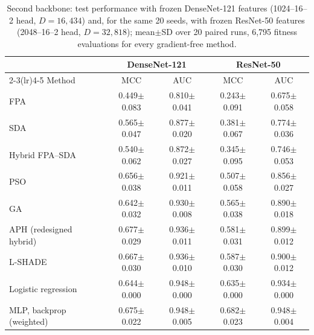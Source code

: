 \begin{table}[!t]
\centering
\caption{Second backbone: test performance with frozen DenseNet-121 features (1024--16--2 head, $D=16{,}434$) and, for the same 20 seeds, with frozen ResNet-50 features (2048--16--2 head, $D=32{,}818$); mean$\pm$SD over 20 paired runs, 6,795 fitness evaluations for every gradient-free method.}
\label{tab:densenet}
\footnotesize
\setlength{\tabcolsep}{4pt}
\begin{tabular}{lcccc}
\toprule
 & \multicolumn{2}{c}{DenseNet-121} & \multicolumn{2}{c}{ResNet-50} \\ \cmidrule(lr){2-3}\cmidrule(lr){4-5}
Method & MCC & AUC & MCC & AUC \\
\midrule
FPA & 0.449$\pm$0.083 & 0.810$\pm$0.041 & 0.243$\pm$0.091 & 0.675$\pm$0.058 \\
SDA & 0.565$\pm$0.047 & 0.877$\pm$0.020 & 0.381$\pm$0.067 & 0.774$\pm$0.036 \\
Hybrid FPA--SDA & 0.540$\pm$0.062 & 0.872$\pm$0.027 & 0.345$\pm$0.095 & 0.746$\pm$0.053 \\
PSO & 0.656$\pm$0.038 & 0.921$\pm$0.011 & 0.507$\pm$0.058 & 0.856$\pm$0.027 \\
GA & 0.642$\pm$0.032 & 0.930$\pm$0.008 & 0.565$\pm$0.038 & 0.890$\pm$0.018 \\
APH (redesigned hybrid) & 0.677$\pm$0.029 & 0.936$\pm$0.011 & 0.581$\pm$0.031 & 0.899$\pm$0.012 \\
L-SHADE & 0.667$\pm$0.030 & 0.936$\pm$0.010 & 0.587$\pm$0.030 & 0.900$\pm$0.012 \\
\midrule
Logistic regression & 0.644$\pm$0.000 & 0.948$\pm$0.000 & 0.635$\pm$0.000 & 0.934$\pm$0.000 \\
MLP, backprop (weighted) & 0.675$\pm$0.022 & 0.948$\pm$0.005 & 0.682$\pm$0.023 & 0.948$\pm$0.004 \\
\bottomrule
\end{tabular}
\end{table}
